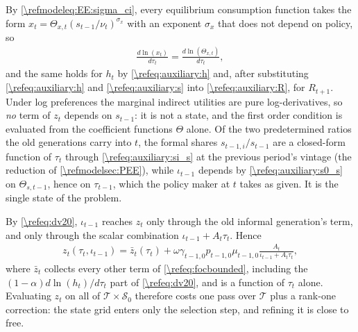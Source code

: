 By \eqref{\refmodeleq:EE:sigma_ci}, every equilibrium consumption function takes the form $x_t = \Theta_{x,t}\left(s_{t-1}/\nu_t\right)^{\sigma_x}$ with an exponent $\sigma_x$ that does not depend on policy, so
\begin{align}\label{\refeq:logsep}
    \frac{d\ln\left(x_t\right)}{d\tau_t} = \frac{d\ln\left(\Theta_{x,t}\right)}{d\tau_t},
\end{align}
and the same holds for $h_t$ by \eqref{\refeq:auxiliary:h} and, after substituting \eqref{\refeq:auxiliary:h} and \eqref{\refeq:auxiliary:s} into \eqref{\refeq:auxiliary:R}, for $R_{t+1}$. Under log preferences the marginal indirect utilities are pure log-derivatives, so \emph{no} term of $z_t$ depends on $s_{t-1}$: it is not a state, and the first order condition is evaluated from the coefficient functions $\Theta$ alone. Of the two predetermined ratios the old generations carry into $t$, the formal shares $s_{t-1,i}/s_{t-1}$ are a closed-form function of $\tau_t$ through \eqref{\refeq:auxiliary:si_s} at the previous period's vintage (the reduction of \cref{\refmodelsec:PEE}), while $\iota_{t-1}$ depends by \eqref{\refeq:auxiliary:s0_s} on $\Theta_{s,t-1}$, hence on $\tau_{t-1}$, which the policy maker at $t$ takes as given. It is the single state of the problem.

By \eqref{\refeq:dv20}, $\iota_{t-1}$ reaches $z_t$ only through the old informal generation's term, and only through the scalar combination $\iota_{t-1}+A_t\tau_t$. Hence
\begin{align}\label{\refeq:zdecomposition}
    z_t\left(\tau_t,\iota_{t-1}\right) = \bar{z}_t\left(\tau_t\right)+\omega\gamma_{t-1,0}p_{t-1,0}\mu_{t-1,0}\frac{A_t}{\iota_{t-1}+A_t\tau_t},
\end{align}
where $\bar{z}_t$ collects every other term of \eqref{\refeq:focbounded}, including the $(1-\alpha)d\ln(h_t)/d\tau_t$ part of \eqref{\refeq:dv20}, and is a function of $\tau_t$ alone. Evaluating $z_t$ on all of $\mathcal{T}\times\mathcal{S}_0$ therefore costs one pass over $\mathcal{T}$ plus a rank-one correction: the state grid enters only the selection step, and refining it is close to free.

